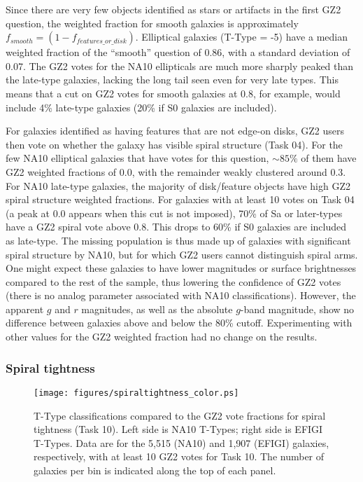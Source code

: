 \documentclass[useAMS,usenatbib]{mn2e}
\begin{document}
Since there are very few objects identified as stars or artifacts in the first GZ2 question, the weighted fraction for smooth galaxies is approximately $f_{smooth} = (1 - f_{features\_or\_disk})$. Elliptical galaxies (T-Type = -5) have a median weighted fraction of the ``smooth'' question of 0.86, with a standard deviation of 0.07. The GZ2 votes for the NA10 ellipticals are much more sharply peaked than the late-type galaxies, lacking the long tail seen even for very late types. This means that a cut on GZ2 votes for smooth galaxies at 0.8, for example, would include 4\% late-type galaxies (20\% if S0 galaxies are included). 

For galaxies identified as having features that are not edge-on disks, GZ2 users then vote on whether the galaxy has visible spiral structure (Task 04). For the few NA10 elliptical galaxies that have votes for this question, $\sim85\%$ of them have GZ2 weighted fractions of 0.0, with the remainder weakly clustered around 0.3. For NA10 late-type galaxies, the majority of disk/feature objects have high GZ2 spiral structure weighted fractions. For galaxies with at least 10 votes on Task 04 (a peak at 0.0 appears when this cut is not imposed), 70\% of Sa or later-types have a GZ2 spiral vote above 0.8. This drops to 60\% if S0 galaxies are included as late-type. The missing population is thus made up of galaxies with significant spiral structure by NA10, but for which GZ2 users cannot distinguish spiral arms. One might expect these galaxies to have lower magnitudes or surface brightnesses compared to the rest of the sample, thus lowering the confidence of GZ2 votes (there is no analog parameter associated with NA10 classifications). However, the apparent $g$ and $r$ magnitudes, as well as the absolute $g$-band magnitude, show no difference between galaxies above and below the 80\% cutoff. Experimenting with other values for the GZ2 weighted fraction had no change on the results.  

\subsubsection{Spiral tightness}

\begin{figure*}
\texttt{[image: figures/spiraltightness\_color.ps]}
\caption{T-Type classifications compared to the GZ2 vote fractions for spiral tightness (Task 10). Left side is NA10 T-Types; right side is EFIGI T-Types. Data are for the 5,515 (NA10) and 1,907 (EFIGI) galaxies, respectively, with at least 10 GZ2 votes for Task 10. The number of galaxies per bin is indicated along the top of each panel. 
\label{fig-spiraltightness}}
\end{figure*}
\end{document}
